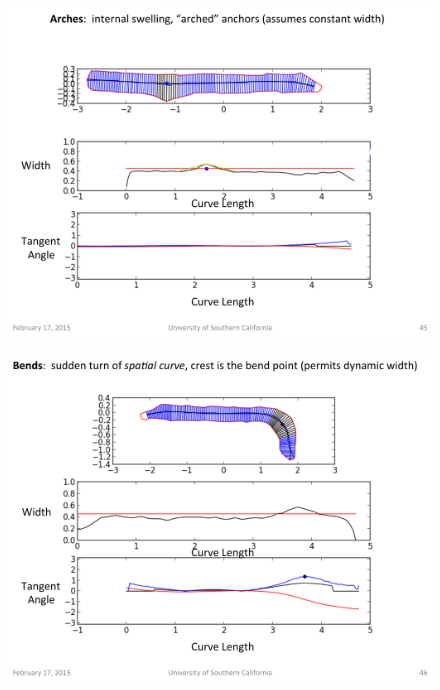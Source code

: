 \begin{figure}[htbp]
\centering
\includegraphics[keepaspectratio,width=\textwidth,height=0.75\textheight]{PastedGraphic2.pdf}
\label{pastedgraphic2.pdf}
\end{figure}




\begin{figure}[htbp]
\centering
\includegraphics[keepaspectratio,width=\textwidth,height=0.75\textheight]{PastedGraphic3.pdf}
\label{pastedgraphic3.pdf}
\end{figure}





